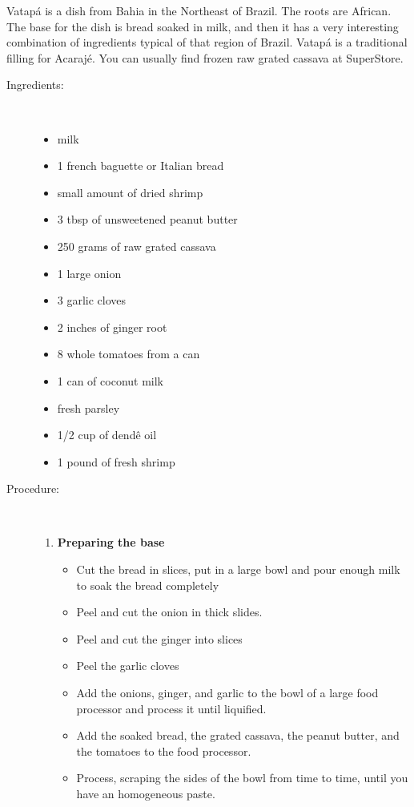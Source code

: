 \documentclass[11pt,letterpaper]{article}
\begin{document}


Vatap\'a is a dish from Bahia in the Northeast of Brazil. The roots are African. The base for the dish is bread soaked in milk, and then it has a very interesting combination of ingredients typical of that region of Brazil. Vatap\'a is a traditional filling for Acaraj\'e. You can usually find frozen raw grated cassava at SuperStore.

\vspace{0.3in}

\begin{description}

\item[Ingredients:]\ \\
	\begin{itemize}
	\item	milk
	\item 1 french baguette or Italian bread
	\item small amount of dried shrimp
	\item 3 tbsp of unsweetened peanut butter  
	\item 250 grams of raw grated cassava
	\item 1 large onion
	\item 3 garlic cloves
	\item 2 inches of ginger root
	\item 8 whole tomatoes from a can
	\item 1 can of coconut milk
	\item fresh parsley
	\item 1/2 cup of dend\^e oil
	\item 1 pound of fresh shrimp
	\end{itemize}

\item[Procedure:]\ \\

	\begin{enumerate}
	\item {\bf Preparing the base}
	\begin{itemize}
	\item Cut the bread in slices, put in a large bowl and pour enough milk to soak the bread completely
	\item Peel and cut the onion in thick slides.
	\item Peel and cut the ginger into slices
	\item Peel the garlic cloves
	\item Add the onions, ginger, and garlic to the bowl of a large food processor and process it until liquified. 
	\item Add the soaked bread, the grated cassava, the peanut butter, and the tomatoes to the food processor.
	\item Process, scraping the sides of the bowl from time to time, until you have an homogeneous paste.
	\end{itemize}
	

\end{enumerate}
\end{description}
\end{document}
